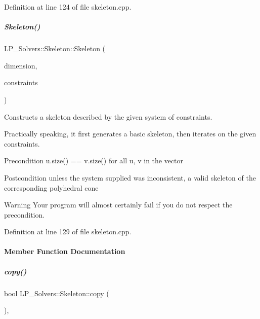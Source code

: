 Definition at line 124 of file skeleton.\+cpp.

\mbox{\label{group___c_l_s_solvers_ad61d70c2397e93141de3ad3c987b1828}} 
\subparagraph{\texorpdfstring{Skeleton()}{Skeleton()}\hspace{0.1cm}{\footnotesize\ttfamily [2/2]}}
{\footnotesize\ttfamily L\+P\+\_\+\+Solvers\+::\+Skeleton\+::\+Skeleton (\begin{DoxyParamCaption}\item[{N\+V\+A\+R\+\_\+\+T\+Y\+PE}]{dimension,  }\item[{const vector$<$ \hyperlink{group___c_l_s_solvers_class_l_p___solvers_1_1_constraint}{Constraint} $>$ \&}]{constraints }\end{DoxyParamCaption})}



Constructs a skeleton described by the given system of constraints. 

Practically speaking, it first generates a basic skeleton, then iterates on the given constraints. \begin{DoxyPrecond}{Precondition}
{\ttfamily u.\+size() == v.\+size()} for all {\ttfamily u}, {\ttfamily v} in the vector 
\end{DoxyPrecond}
\begin{DoxyPostcond}{Postcondition}
unless the system supplied was inconsistent, a valid skeleton of the corresponding polyhedral cone 
\end{DoxyPostcond}
\begin{DoxyWarning}{Warning}
Your program will almost certainly fail if you do not respect the precondition. 
\end{DoxyWarning}


Definition at line 129 of file skeleton.\+cpp.



\paragraph{Member Function Documentation}
\mbox{\label{group___c_l_s_solvers_a242f1dc35468e2326e6f7c10bc0d0fd4}} 
\subparagraph{\texorpdfstring{copy()}{copy()}}
{\footnotesize\ttfamily bool L\+P\+\_\+\+Solvers\+::\+Skeleton\+::copy (\begin{DoxyParamCaption}\item[{const \hyperlink{group___c_l_s_solvers_class_l_p___solvers_1_1_l_p___solver}{L\+P\+\_\+\+Solver} $\ast$}]{ }\end{DoxyParamCaption})\hspace{0.3cm}{\ttfamily [override]}, {\ttfamily [virtual]}}



